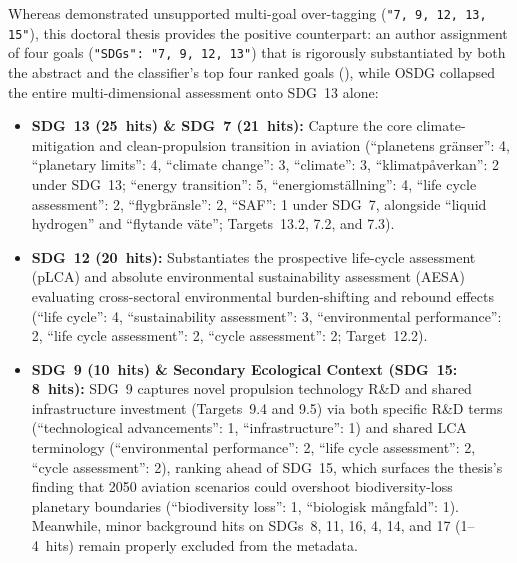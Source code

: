 \begin{casestudySection}
Whereas  demonstrated unsupported multi-goal over-tagging (\texttt{"7, 9, 12, 13, 15"}), this doctoral thesis provides the positive counterpart: an author assignment of four goals (\texttt{"SDGs": "7, 9, 12, 13"}) that is rigorously substantiated by both the abstract and the classifier's top four ranked goals (), while OSDG collapsed the entire multi-dimensional assessment onto \gls{SDG}~13 alone:
\begin{itemize}
    \item \textbf{\gls{SDG}~13 (\num{25}~hits) \& \gls{SDG}~7 (\num{21}~hits):} Capture the core climate-mitigation and clean-propulsion transition in aviation (\enquote{\foreignlanguage{swedish}{planetens gränser}}: 4, \enquote{planetary limits}: 4, \enquote{climate change}: 3, \enquote{climate}: 3, \enquote{\foreignlanguage{swedish}{klimatpåverkan}}: 2 under \gls{SDG}~13; \enquote{energy transition}: 5, \enquote{\foreignlanguage{swedish}{energiomställning}}: 4, \enquote{life cycle assessment}: 2, \enquote{\foreignlanguage{swedish}{flygbränsle}}: 2, \enquote{SAF}: 1 under \gls{SDG}~7, alongside \enquote{liquid hydrogen} and \enquote{\foreignlanguage{swedish}{flytande väte}}; Targets~13.2, 7.2, and 7.3).

    \item \textbf{\gls{SDG}~12 (\num{20}~hits):} Substantiates the prospective life-cycle assessment (pLCA) and absolute environmental sustainability assessment (AESA) evaluating cross-sectoral environmental burden-shifting and rebound effects (\enquote{life cycle}: 4, \enquote{sustainability assessment}: 3, \enquote{environmental performance}: 2, \enquote{life cycle assessment}: 2, \enquote{cycle assessment}: 2; Target~12.2).

    \item \textbf{\gls{SDG}~9 (\num{10}~hits) \& Secondary Ecological Context (\gls{SDG}~15: \num{8}~hits):} \gls{SDG}~9 captures novel propulsion technology R\&D and shared infrastructure investment (Targets~9.4 and 9.5) via both specific R\&D terms (\enquote{technological advancements}: 1, \enquote{infrastructure}: 1) and shared \gls{LCA} terminology (\enquote{environmental performance}: 2, \enquote{life cycle assessment}: 2, \enquote{cycle assessment}: 2), ranking ahead of \gls{SDG}~15, which surfaces the thesis's finding that 2050 aviation scenarios could overshoot biodiversity-loss planetary boundaries (\enquote{biodiversity loss}: 1, \enquote{\foreignlanguage{swedish}{biologisk mångfald}}: 1). Meanwhile, minor background hits on \glspl{SDG}~8, 11, 16, 4, 14, and 17 (\num{1}--\num{4}~hits) remain properly excluded from the metadata.
\end{itemize}
\end{casestudySection}

